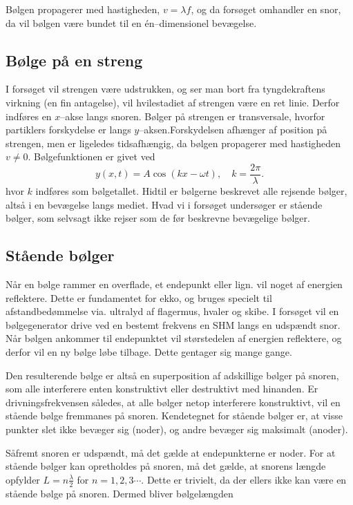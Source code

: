 \documentclass[A2_main.tex]{subfiles}
\begin{document}
Bølgen propagerer med hastigheden, $v = \lambda f$, og da forsøget omhandler en snor, da vil bølgen være bundet til en én--dimensionel bevægelse.

\subsection{Bølge på en streng}
I forsøget vil strengen være udstrukken, og ser man bort fra tyngdekraftens virkning (en fin antagelse), vil hvilestadiet af strengen være en ret linie. Derfor indføres en $x$--akse langs snoren. Bølger på strengen er transversale, hvorfor partiklers forskydelse er langs $y$--aksen.Forskydelsen afhænger af position på strengen, men er ligeledes tidsafhængig, da bølgen propagerer med hastigheden $v\neq 0$. Bølgefunktionen er givet ved
\begin{equation}
    y(x, t) = A\cos(kx -\omega t), \quad k = \frac{2\pi}{\lambda}.
    \label{eq: wave}
\end{equation}
hvor $k$ indføres som bølgetallet. Hidtil er bølgerne beskrevet alle rejsende bølger, altså i en bevægelse langs mediet. Hvad vi i forsøget undersøger er stående bølger, som selvsagt ikke rejser som de før beskrevne bevægelige bølger.

\subsection{Stående bølger}
Når en bølge rammer en overflade, et endepunkt eller lign. vil noget af energien reflektere. Dette er fundamentet for ekko, og bruges specielt til afstandbedømmelse via. ultralyd af flagermus, hvaler og skibe. I forsøget vil en bølgegenerator drive ved en bestemt frekvens en SHM langs en udspændt snor. Når bølgen ankommer til endepunktet vil størstedelen af energien reflektere, og derfor vil en ny bølge løbe tilbage. Dette gentager sig mange gange. 

Den resulterende bølge er altså en superposition af adskillige bølger på snoren, som alle interferere enten konstruktivt eller destruktivt med hinanden. Er drivningsfrekvensen således, at alle bølger netop interferere konstruktivt, vil en stående bølge fremmanes på snoren. Kendetegnet for stående bølger er, at visse punkter slet ikke bevæger sig (noder), og andre bevæger sig maksimalt (anoder).

Såfremt snoren er udspændt, må det gælde at endepunkterne er noder. For at stående bølger kan opretholdes på snoren, må det gælde, at snorens længde opfylder $L=n\frac{\lambda}{2}$ for $n=1,2,3\cdots$. Dette er trivielt, da der ellers ikke kan være en stående bølge på snoren. Dermed bliver bølgelængden
\end{document}
